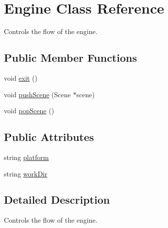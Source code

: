 \hypertarget{class_engine}{\section{Engine Class Reference}
\label{class_engine}
}


Controls the flow of the engine.  


\subsection*{Public Member Functions}
\begin{DoxyCompactItemize}
\item 
void \hyperlink{class_engine_a358d2e2397ca11ccd17553e3c40e7901}{exit} ()
\item 
void \hyperlink{class_engine_aee05edca6334bc473a1ba1319152e39d}{push\+Scene} (Scene $\ast$scene)
\item 
void \hyperlink{class_engine_a986825afe276e17d22b817f535a80423}{pop\+Scene} ()
\end{DoxyCompactItemize}
\subsection*{Public Attributes}
\begin{DoxyCompactItemize}
\item 
string \hyperlink{class_engine_ab33ce334382344871104873746995d5d}{platform}
\item 
string \hyperlink{class_engine_a3fe0ea911c35ded34831c9c13e8c3d53}{work\+Dir}
\end{DoxyCompactItemize}


\subsection{Detailed Description}
Controls the flow of the engine. 

